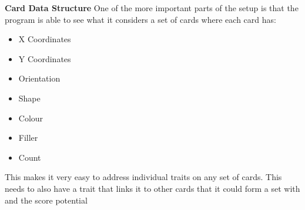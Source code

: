 	
\textbf{Card Data Structure}
One of the more important parts of the setup is that the program is able to see what it considers a set of cards where each card has:

\begin{itemize}
	\item X Coordinates
	\item Y Coordinates
	\item Orientation
	\item Shape
	\item Colour
	\item Filler
	\item Count
\end{itemize}

This makes it very easy to address individual traits on any set of cards. This needs to also have a trait that links it to other cards that it could form a set with and the score potential 
